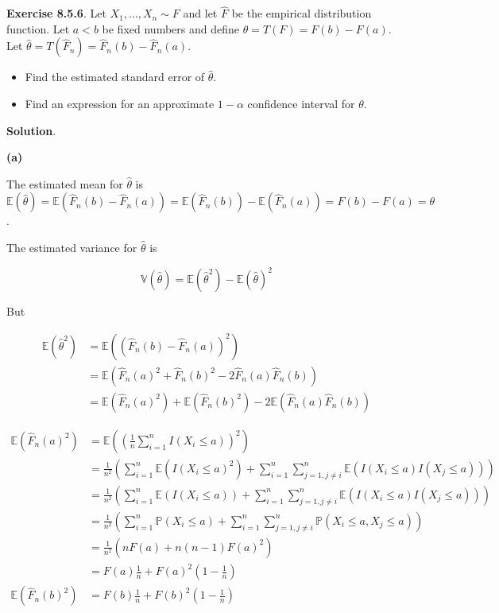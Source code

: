 \textbf{Exercise 8.5.6}. Let \(X_1, \dots, X_n \sim F\) and let
\(\hat{F}\) be the empirical distribution function. Let \(a < b\) be
fixed numbers and define \(\theta = T(F) = F(b) - F(a)\). Let
\(\hat{\theta} = T(\hat{F}_n) = \hat{F}_n(b) - \hat{F}_n(a)\).

\begin{itemize}[tightlist]
\item
  Find the estimated standard error of \(\hat{\theta}\).
\item
  Find an expression for an approximate \(1 - \alpha\) confidence
  interval for \(\theta\).
\end{itemize}

\textbf{Solution}.

\textbf{(a)}

The estimated mean for \(\hat{\theta}\) is
\(\mathbb{E}(\hat{\theta}) = \mathbb{E}(\hat{F}_n(b) - \hat{F}_n(a)) = \mathbb{E}(\hat{F}_n(b)) - \mathbb{E}(\hat{F}_n(a)) = F(b) - F(a) = \theta\).

The estimated variance for \(\hat{\theta}\) is

\[ \mathbb{V}(\hat{\theta}) = \mathbb{E}(\hat{\theta}^2) - \mathbb{E}(\hat{\theta})^2 \]

But

\begin{align}
\mathbb{E}(\hat{\theta}^2) & = \mathbb{E}((\hat{F}_n(b) - \hat{F}_n(a))^2)  \\
&= \mathbb{E}(\hat{F}_n(a)^2 + \hat{F}_n(b)^2 - 2 \hat{F}_n(a)\hat{F}_n(b)) \\
&= \mathbb{E}(\hat{F}_n(a)^2) + \mathbb{E}(\hat{F}_n(b)^2) - 2 \mathbb{E}(\hat{F}_n(a)\hat{F}_n(b))
\end{align}

\begin{align}
\mathbb{E}(\hat{F}_n(a)^2) & = \mathbb{E}\left(\left(\frac{1}{n} \sum_{i=1}^n I(X_i \leq a)\right)^2\right) \\
& = \frac{1}{n^2} \left(\sum_{i=1}^n \mathbb{E} \left( I(X_i \leq a)^2 \right) + \sum_{i=1}^n \sum_{j=1, j \neq i}^n \mathbb{E}\left( I(X_i \leq a) I(X_j \leq a) \right) \right) \\
& = \frac{1}{n^2} \left(\sum_{i=1}^n \mathbb{E} \left( I(X_i \leq a) \right) + \sum_{i=1}^n \sum_{j=1, j \neq i}^n \mathbb{E}\left( I(X_i \leq a) I(X_j \leq a) \right) \right) \\
& = \frac{1}{n^2} \left(\sum_{i=1}^n \mathbb{P} \left( X_i \leq a \right) + \sum_{i=1}^n \sum_{j=1, j \neq i}^n \mathbb{P}\left( X_i \leq a, X_j \leq a \right) \right) \\
& = \frac{1}{n^2} \left(n F(a) + n(n-1) F(a)^2 \right) \\
&= F(a) \frac{1}{n} + F(a)^2 \left(1 - \frac{1}{n} \right) \\
\mathbb{E}(\hat{F}_n(b)^2) & = F(b) \frac{1}{n} + F(b)^2 \left(1 - \frac{1}{n} \right)
\end{align}

